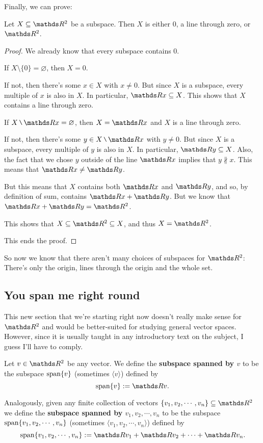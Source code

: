 Finally, we can prove:

\begin{theorem}
	Let $X\subseteq \R^2$ be a subspace. Then $X$ is either 0, a line through zero, or $\R^2$.
\end{theorem}
\begin{proof}
	We already know that every subspace contains 0.
	
	If $X\setminus\{0\}=\varnothing$, then $X=0$.
	
	\bigskip
	If not, then there's some $x\in X$ with $x\neq 0$. But since $X$ is a subspace, every multiple of $x$ is also in $X$. In particular, $\R x\subseteq X$. This shows that $X$ contains a line through zero.
	
	If $X\setminus\R x=\varnothing$, then $X=\R x$ and $X$ is a line through zero.
	
	\bigskip
	If not, then there's some $y\in X\setminus\R x$ with $y\neq 0$. But since $X$ is a subspace, every multiple of $y$ is also in $X$. In particular, $\R y\subseteq X$. Also, the fact that we chose $y$ outside of the line $\R x$ implies that $y\nparallel x$. This means that $\R x\neq\R y$.
	
	But this means that $X$ contains both $\R x$ and $\R y$, and so, by definition of sum, contains $\R x+\R y$. But we know that $\R x+\R y=\R^2$.
	
	This shows that $X\subseteq \R^2\subseteq X$, and thus $X=\R^2$.
	
	This ends the proof.
\end{proof}

So now we know that there aren't many choices of subspaces for $\R^2$: There's only the origin, lines through the origin and the whole set.

\newpage
\subsection{You span me right round}

This new section that we're starting right now doesn't really make sense for $\R^2$ and would be better-suited for studying general vector spaces. However, since it is usually taught in any introductory text on the subject, I guess I'll have to comply.

\begin{df}
	Let $v\in \R^2$ be any vector. We define the \textbf{subspace spanned by $v$} to be the subspace $\operatorname{span} \{v\}$ (sometimes $\langle v\rangle$) defined by
	\[\spen\{v\}:=\R v.\]
	
	Analogously, given any finite collection of vectors $\{v_1,v_2,\cdots,v_n\}\subseteq \R^2$ we define the \textbf{subspace spanned by $v_1,v_2,\cdots,v_n$} to be the subspace $\operatorname{span}\{v_1,v_2,\cdots,v_n\}$ (sometimes $\langle v_1,v_2,\cdots,v_n\rangle$) defined by
	\[\spen\{v_1,v_2,\cdots,v_n\}:=\R v_1+\R v_2+\cdots+\R v_n.\]
\end{df}

